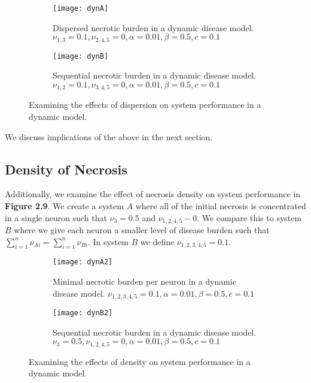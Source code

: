 \documentclass[11pt]{report}
\begin{document}
\begin{figure}
    \centering
    \begin{subfigure}[b]{0.48\textwidth}
        \texttt{[image: dynA]}
        \caption{Dispersed necrotic burden in a dynamic disease model. $\nu_{1,3} = 0.1, \nu_{2,4,5} = 0, \alpha = 0.01, \beta = 0.5,c = 0.1$}
        \label{fig:statA}
    \end{subfigure}
    \hfill %
    \begin{subfigure}[b]{0.48\textwidth}
        \texttt{[image: dynB]}
        \caption{Sequential necrotic burden in a dynamic disease model. $\nu_{1,2} = 0.1, \nu_{3,4,5} = 0, \alpha = 0.01, \beta = 0.5,c = 0.1$}
        \label{fig:statB}
    \end{subfigure}
    \caption{Examining the effects of dispersion on system performance in a dynamic model. }\label{fig:dispersion}
\end{figure}

We discuss implications of the above in the next section. 


\subsection{Density of Necrosis} %
\label{sub:density_of_necrosis}


Additionally, we examine the effect of necrosis density on system performance in \textbf{Figure 2.9}. We create a system $A$ where all of the initial necrosis is concentrated in a single neuron such that $\nu_3 = 0.5$ and $\nu_{1,2,4,5} - 0$. We compare this to system $B$ where we give each neuron a smaller level of disease burden such that $\sum^n_{i=1} \nu_{Ai} = \sum^n_{i=1} \nu_{Bi}$. In system $B$ we define $\nu_{1,2,3,4,5} = 0.1$.


\begin{figure}
    \centering
    \begin{subfigure}[b]{0.48\textwidth}
        \texttt{[image: dynA2]}
        \caption{Minimal necrotic burden per neuron in a dynamic disease model. $\nu_{1,2,3,4,5} = 0.1, \alpha = 0.01, \beta = 0.5,c = 0.1$}
        \label{fig:dynA2}
    \end{subfigure}
    \hfill %
    \begin{subfigure}[b]{0.48\textwidth}
        \texttt{[image: dynB2]}
        \caption{Sequential necrotic burden in a dynamic disease model. $\nu_{3} = 0.5, \nu_{1,2,4,5} = 0, \alpha = 0.01, \beta = 0.5,c = 0.1$}
        \label{fig:dynB2}
    \end{subfigure}
    \caption{Examining the effects of density on system performance in a dynamic model. }\label{fig:dispersion}
\end{figure}
\end{document}
